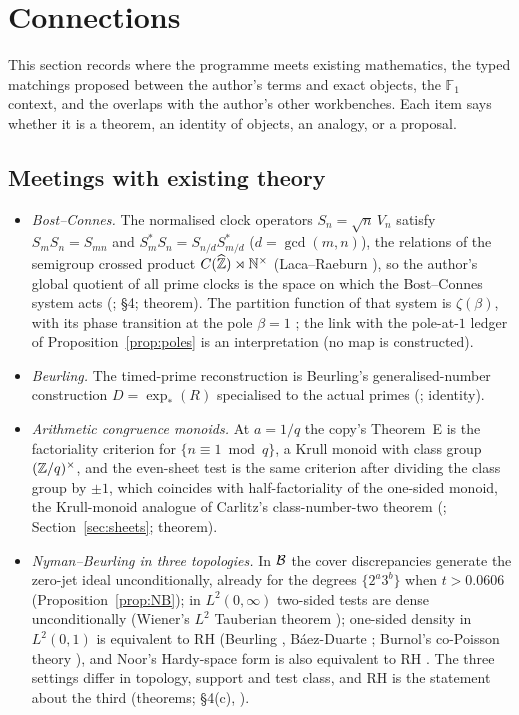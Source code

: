 \section{Connections}\label{sec:bridges}

This section records where the programme meets existing mathematics, the typed matchings proposed between the author's terms and exact objects, the $\mathbb{F}_1$ context, and the overlaps with the author's other workbenches. Each item says whether it is a theorem, an identity of objects, an analogy, or a proposal.

\subsection{Meetings with existing theory}

\begin{itemize}
\item \emph{Bost--Connes.} The normalised clock operators $S_n=\sqrt n\,V_n$ satisfy $S_mS_n=S_{mn}$ and $S_m^*S_n=S_{n/d}S_{m/d}^*$ ($d=\gcd(m,n)$), the relations of the semigroup crossed product $C(\widehat{\mathbb{Z}})\rtimes\mathbb{N}^\times$ (Laca--Raeburn \cite{LacaRaeburn}), so the author's global quotient of all prime clocks is the space on which the Bost--Connes system acts (;  §4; theorem). The partition function of that system is $\zeta(\beta)$, with its phase transition at the pole $\beta=1$ \cite{BostConnes}; the link with the pole-at-$1$ ledger of Proposition~\ref{prop:poles} is an interpretation (no map is constructed).
\item \emph{Beurling.} The timed-prime reconstruction is Beurling's generalised-number construction $D=\exp_*(R)$ specialised to the actual primes (; identity).
\item \emph{Arithmetic congruence monoids.} At $a=1/q$ the copy's Theorem~E is the factoriality criterion for $\{n\equiv1\bmod q\}$, a Krull monoid with class group $(\mathbb{Z}/q)^\times$, and the even-sheet test is the same criterion after dividing the class group by $\pm1$, which coincides with half-factoriality of the one-sided monoid, the Krull-monoid analogue of Carlitz's class-number-two theorem (\cite{BaginskiChapman,Carlitz}; Section~\ref{sec:sheets}; theorem).
\item \emph{Nyman--Beurling in three topologies.} In $\mathcal{B}$ the cover discrepancies generate the zero-jet ideal unconditionally, already for the degrees $\{2^a3^b\}$ when $t>0.0606$ (Proposition~\ref{prop:NB}); in $L^2(0,\infty)$ two-sided tests are dense unconditionally (Wiener's $L^2$ Tauberian theorem \cite{Wiener}); one-sided density in $L^2(0,1)$ is equivalent to RH (Beurling \cite{Beurling}, Báez-Duarte \cite{BaezDuarte}; Burnol's co-Poisson theory \cite{Burnol}), and Noor's Hardy-space form is also equivalent to RH \cite{Noor}. The three settings differ in topology, support and test class, and RH is the statement about the third (theorems;  §4(c), ).

\end{itemize}

